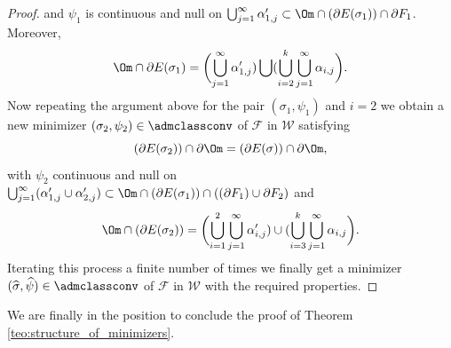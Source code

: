\begin{proof}
and $\psi_1$ is continuous and null on $\bigcup_{j=1}^\infty\alpha'_{1,j}\subset \Om\cap(\partial E(\sigma_{1}))\cap\partial F_1$.
Moreover,\vspace*{-3pt}
\begin{equation*}
\Om\cap \partial E(\sigma_1)=\biggl(\bigcup_{j=1}^\infty\alpha'_{1,j})\bigcup
(\bigcup_{i=2}^k\bigcup_{j=1}^\infty \alpha_{i,j}\biggr).
\end{equation*}
Now repeating the argument above for the pair $(\sigma_1,\psi_1)$ and $i=2$ we obtain a new minimizer $(\sigma_2,\psi_2)\in\admclassconv$ of $\mathcal F$ in $\mathcal W$ satisfying\vspace*{-3pt}
\begin{equation*}
(\partial E(\sigma_{2}))\cap\partial\Om= (\partial E(\sigma))\cap\partial\Om,
\end{equation*}
with $\psi_2$ continuous and null on $\bigcup_{j=1}^\infty(\alpha'_{1,j}\cup\alpha'_{2,j})\subset \Om \cap (\partial E(\sigma_{1}))\cap((\partial F_1)\cup\partial F_2)$
and\vspace*{-3pt}
\begin{equation*}
\Om \cap (\partial E(\sigma_2))=\biggl(\bigcup_{i=1}^2\bigcup_{j=1}^\infty\alpha'_{i,j})\cup
(\bigcup_{i=3}^k\bigcup_{j=1}^\infty \alpha_{i,j}\biggr).
\end{equation*}
Iterating this process a finite number of times we finally get a minimizer $(\widehat\sigma,\widehat\psi)\in\admclassconv$ of $\mathcal F$ in $\mathcal W$ with the required properties.
\end{proof}

We are finally in the position to conclude the proof of Theorem \ref{teo:structure_of_minimizers}.

